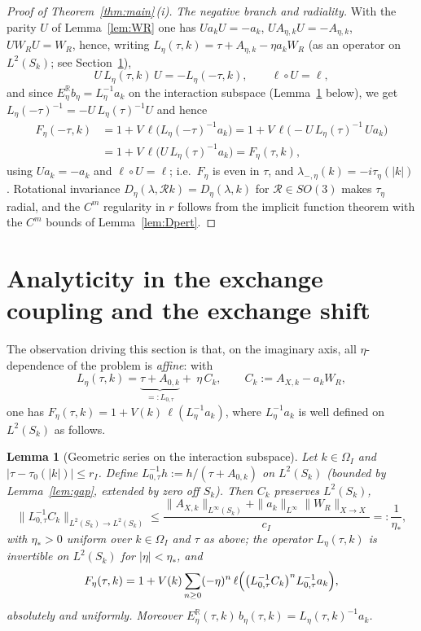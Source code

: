 \documentclass[11pt,a4paper]{amsart}
\newtheorem{lemma}[theorem]{Lemma}
\theoremstyle{definition}
\theoremstyle{remark}
\newcommand{\R}{\mathbb{R}}
\newcommand{\ellf}{\ell}
\begin{document}
\begin{proof}[Proof of Theorem~\ref{thm:main}\,(i)]
\emph{The negative branch and radiality.} With the parity $U$ of Lemma~\ref{lem:WR} one has $Ua_kU=-a_k$, $UA_{\eta,k}U=-A_{\eta,k}$, $UW_RU=W_R$, hence, writing $L_\eta(\tau,k)=\tau+A_{\eta,k}-\eta a_kW_R$ (as an operator on $L^2(S_k)$; see Section~\ref{sec:analyticity}),
\[
U\,L_\eta(\tau,k)\,U=-L_\eta(-\tau,k),\qquad \ellf\circ U=\ellf ,
\]
and since $E^\R_\eta b_\eta=L_\eta^{-1}a_k$ on the interaction subspace (Lemma~\ref{lem:geom} below), we get $L_\eta(-\tau)^{-1}=-U\,L_\eta(\tau)^{-1}U$ and hence
\begin{align*}
F_\eta(-\tau,k)&=1+V\,\ellf\bigl(L_\eta(-\tau)^{-1}a_k\bigr)
=1+V\,\ellf\bigl(-U\,L_\eta(\tau)^{-1}\,Ua_k\bigr)\\
&=1+V\,\ellf\bigl(U\,L_\eta(\tau)^{-1}a_k\bigr)
=F_\eta(\tau,k),
\end{align*}
using $Ua_k=-a_k$ and $\ellf\circ U=\ellf$; i.e.\ $F_\eta$ is even in $\tau$, and $\lambda_{-,\eta}(k)=-i\tau_\eta(|k|)$. Rotational invariance $D_\eta(\lambda,\mathcal Rk)=D_\eta(\lambda,k)$ for $\mathcal R\in SO(3)$ makes $\tau_\eta$ radial, and the $C^m$ regularity in $r$ follows from the implicit function theorem with the $C^m$ bounds of Lemma~\ref{lem:Dpert}.
\end{proof}

\section{Analyticity in the exchange coupling and the exchange shift}\label{sec:analyticity}

The observation driving this section is that, on the imaginary axis, all $\eta$-dependence of the problem is \emph{affine}: with
\begin{equation}\label{eq:LC}
L_\eta(\tau,k)=\underbrace{\tau+A_{0,k}}_{=:L_{0,\tau}}+\ \eta\,C_k,
\qquad C_k:=A_{X,k}-a_kW_R ,
\end{equation}
one has $F_\eta(\tau,k)=1+V(k)\,\ellf(L_\eta^{-1}a_k)$, where $L_\eta^{-1}a_k$ is well defined on $L^2(S_k)$ as follows.

\begin{lemma}[Geometric series on the interaction subspace]\label{lem:geom}
Let $k\in\Omega_I$ and $|\tau-\tau_0(|k|)|\le r_I$. Define $L_{0,\tau}^{-1}h:=h/(\tau+A_{0,k})$ on $L^2(S_k)$ \textup{(}bounded by Lemma~\textup{\ref{lem:gap}}, extended by zero off $S_k$\textup{)}. Then $C_k$ preserves $L^2(S_k)$,
\begin{equation}\label{eq:etastar}
\bigl\|L_{0,\tau}^{-1}C_k\bigr\|_{L^2(S_k)\to L^2(S_k)}\le
\frac{\|A_{X,k}\|_{L^\infty(S_k)}+\|a_k\|_{L^\infty}\|W_R\|_{X\to X}}{c_I}=:\frac1{\eta_*},
\end{equation}
with $\eta_*>0$ uniform over $k\in\Omega_I$ and $\tau$ as above; the operator $L_\eta(\tau,k)$ is invertible on $L^2(S_k)$ for $|\eta|<\eta_*$, and
\begin{equation}\label{eq:geomF}
F_\eta(\tau,k)=1+V(k)\sum_{n\ge0}(-\eta)^n\,
\ellf\Bigl(\bigl(L_{0,\tau}^{-1}C_k\bigr)^{n}L_{0,\tau}^{-1}a_k\Bigr),
\end{equation}
absolutely and uniformly. Moreover $E^\R_\eta(\tau,k)\,b_\eta(\tau,k)=L_\eta(\tau,k)^{-1}a_k$.
\end{lemma}
\end{document}
